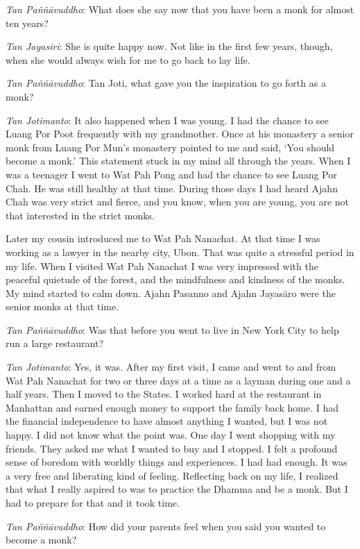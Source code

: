 \emph{Tan Paññāvuddho}: What does she say now that you have been a monk
for almost ten years? 

\emph{Tan Jayasiri}: She is quite happy now. Not like in the first few
years, though, when she would always wish for me to go back to lay life. 

\emph{Tan Paññāvuddho}: Tan Joti, what gave you the inspiration to go
forth as a monk? 

\emph{Tan Jotimanto}: It also happened when I was young. I had the
chance to see Luang Por Poot frequently with my grandmother. Once at his
monastery a senior monk from Luang Por Mun's monastery pointed to me and
said, `You should become a monk.' This statement stuck in my mind all
through the years. When I was a teenager I went to Wat Pah Pong and had
the chance to see Luang Por Chah. He was still healthy at that time. 
During those days I had heard Ajahn Chah was very strict and fierce, and
you know, when you are young, you are not that interested in the strict
monks. 

Later my cousin introduced me to Wat Pah Nanachat. At that time I was
working as a lawyer in the nearby city, Ubon. That was quite a stressful
period in my life. When I visited Wat Pah Nanachat I was very impressed
with the peaceful quietude of the forest, and the mindfulness and
kindness of the monks. My mind started to calm down. Ajahn Pasanno and
Ajahn Jayasāro were the senior monks at that time. 

\emph{Tan Paññāvuddho}: Was that before you went to live in New York
City to help run a large restaurant? 

\emph{Tan Jotimanto}: Yes, it was. After my first visit, I came and went
to and from Wat Pah Nanachat for two or three days at a time as a layman
during one and a half years. Then I moved to the States. I worked hard
at the restaurant in Manhattan and earned enough money to support the
family back home. I had the financial independence to have almost
anything I wanted, but I was not happy. I did not know what the point
was. One day I went shopping with my friends. They asked me what I
wanted to buy and I stopped. I felt a profound sense of boredom with
worldly things and experiences. I had had enough. It was a very free and
liberating kind of feeling. Reflecting back on my life, I realized that
what I really aspired to was to practice the Dhamma and be a monk. But I
had to prepare for that and it took time. 

\emph{Tan Paññāvuddho}: How did your parents feel when you said you
wanted to become a monk? 

